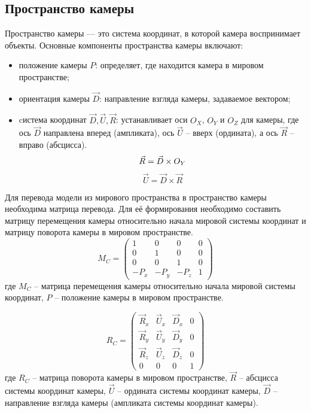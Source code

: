 \subsection{Пространство камеры}

Пространство камеры — это система координат, в которой камера воспринимает объекты. Основные компоненты пространства камеры включают:

\begin{itemize}[label=--]
	\item положение камеры $P$: определяет, где находится камера в мировом пространстве;
	\item ориентация камеры $\vec{D}$: направление взгляда камеры, задаваемое вектором;
	\item cистема координат $\vec{D}, \vec{U}, \vec{R}$: устанавливает оси $O_X$, $O_Y$ и $O_Z$ для камеры, где ось $\vec{D}$ направлена вперед (ампликата), ось $\vec{U}$ -- вверх (ордината), а ось $\vec{R}$ -- вправо (абсцисса).
	\begin{equation}
		\vec{R} = \vec{D} \times O_Y \\
	\end{equation}
	\begin{equation}
		\vec{U} = \vec{D} \times \vec{R}
	\end{equation}
\end{itemize}

Для перевода модели из мирового пространства в пространство камеры необходима матрица перевода. Для её формирования необходимо составить матрицу перемещения камеры относительно начала мировой системы координат и матрицу поворота камеры в мировом пространстве.
\begin{equation}
	M_C = 
	\begin{pmatrix}
		1 & 0 & 0 & 0 \\
		0 & 1 & 0 & 0 \\
		0 & 0 & 1 & 0 \\
		-P_x & -P_y & -P_z & 1
	\end{pmatrix}
\end{equation}
где $M_C$ -- матрица перемещения камеры относительно начала мировой системы координат, $P$ -- положение камеры в мировом пространстве.

\begin{equation}
	R_C = 
	\begin{pmatrix}
		\vec{R}_x & \vec{U}_x & \vec{D}_x & 0 \\
		\vec{R}_y & \vec{U}_y & \vec{D}_y & 0 \\
		\vec{R}_z & \vec{U}_z & \vec{D}_z & 0 \\
		0 & 0 & 0 & 1 
	\end{pmatrix}
\end{equation}
где $R_C$ -- матрица поворота камеры в мировом пространстве, $\vec{R}$ -- абсцисса системы координат камеры, $\vec{U}$ -- ордината системы координат камеры, $\vec{D}$ -- направление взгляда камеры (ампликата системы координат камеры).

